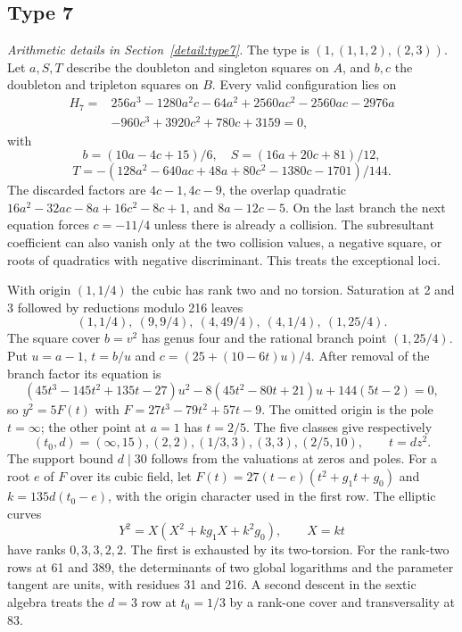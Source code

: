 \subsection{Type 7}\label{app:type7}
\noindent\emph{Arithmetic details in Section~\ref{detail:type7}.}\enspace
The type is $(1,(1,1,2),(2,3))$. Let $a,S,T$ describe the doubleton
and singleton squares on $A$, and $b,c$ the doubleton and tripleton
squares on $B$. Every valid configuration lies on
\[
\begin{split}
 H_7={}&256a^3-1280a^2c-64a^2+2560ac^2-2560ac-2976a\\
       &-960c^3+3920c^2+780c+3159=0,
\end{split}
\]
with
\[
 b=(10a-4c+15)/6,\quad S=(16a+20c+81)/12,
\]\[
 T=-(128a^2-640ac+48a+80c^2-1380c-1701)/144.
\]
The discarded factors are $4c-1,4c-9$, the overlap quadratic
$16a^2-32ac-8a+16c^2-8c+1$, and $8a-12c-5$.
On the last branch the next equation forces $c=-11/4$ unless there
is already a collision. The subresultant coefficient can also vanish
only at the two collision values, a negative square, or roots of
quadratics with negative discriminant. This treats the exceptional loci.

With origin $(1,1/4)$ the cubic has rank two and no torsion.
Saturation at 2 and 3 followed by reductions modulo 216 leaves
\[
 (1,1/4),\ (9,9/4),\ (4,49/4),\ (4,1/4),\ (1,25/4).
\]
The square cover $b=v^2$ has genus four and the rational branch point
$(1,25/4)$. Put $u=a-1$, $t=b/u$ and
$c=(25+(10-6t)u)/4$. After removal of the branch factor its equation is
\[
 (45t^3-145t^2+135t-27)u^2-8(45t^2-80t+21)u+144(5t-2)=0,
\]
so $y^2=5F(t)$ with $F=27t^3-79t^2+57t-9$.
The omitted origin is the pole $t=\infty$; the other point at $a=1$
has $t=2/5$. The five classes give respectively
\[
 (t_0,d)=(\infty,15),(2,2),(1/3,3),(3,3),(2/5,10),\qquad t=dz^2.
\]
The support bound $d\mid30$ follows from the valuations at zeros and poles.
For a root $e$ of $F$ over its cubic field, let
$F(t)=27(t-e)(t^2+g_1t+g_0)$ and $k=135d(t_0-e)$, with the
origin character used in the first row. The elliptic curves
\[
 Y^2=X(X^2+kg_1X+k^2g_0),\qquad X=kt
\]
have ranks $0,3,3,2,2$. The first is exhausted by its two-torsion.
For the rank-two rows at 61 and 389, the determinants of two global
logarithms and the parameter tangent are units, with residues 31 and
216. A second descent in the sextic algebra treats the $d=3$ row
at $t_0=1/3$ by a rank-one cover and transversality at 83.

